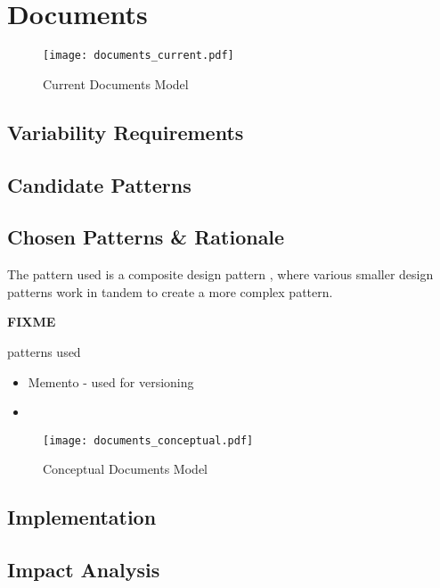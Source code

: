 \section{Documents}\label{sec:fa_documents}

\begin{figure}[H]
  \centering
  \texttt{[image: documents\_current.pdf]}
  \caption{Current Documents Model}
  \label{fig:documents_current}
\end{figure}

\subsection{Variability Requirements}\label{sec:fa_documents_variability_requirements}

\subsection{Candidate Patterns}\label{sec:fa_documents_candidate_patterns}

\subsection{Chosen Patterns \& Rationale}\label{sec:fa_documents_chosen_patterns_rationale}

The pattern used is a composite design pattern \cite{riehle_composite_patterns}, where various smaller design patterns work in tandem to create a more complex pattern.


\textbf{FIXME}

patterns used
\begin{itemize}
  \item Memento - used for versioning
  \item 
\end{itemize}

\begin{figure}[H]
  \centering
  \texttt{[image: documents\_conceptual.pdf]}
  \caption{Conceptual Documents Model}
  \label{fig:documents_conceptual}
\end{figure}

\subsection{Implementation}\label{sec:fa_documents_implementation}

\subsection{Impact Analysis}\label{sec:fa_documents_impact_analysis}

